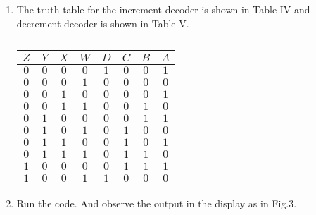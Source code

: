 \documentclass[conference]{IEEEtran}
\begin{document}
\begin {enumerate}
\begin{table} [htbp]
\centering
\begin{tabular}{| c | c | c | c | c | c | c |c |} \hline
$Z$ & $Y$ & $X$ & $W$ & $D$ & $C$ & $B$ & $A$ \\\hline
$0$ & $0$ & $0$ & $0$ & $0$ & $0$ & $0$ & $1$ \\ \hline 
$0$ & $0$ & $0$ & $1$ & $0$ & $0$ & $1$ & $0$ \\ \hline
$0$ & $0$ & $1$ & $0$ & $0$ & $0$ & $1$ & $1$ \\ \hline
$0$ & $0$ & $1$ & $1$ & $0$ & $1$ & $0$ & $0$ \\ \hline
$0$ & $1$ & $0$ & $0$ & $0$ & $1$ & $0$ & $1$ \\ \hline
$0$ & $1$ & $0$ & $1$ & $0$ & $1$ & $1$ & $0$ \\ \hline
$0$ & $1$ & $1$ & $0$ & $0$ & $1$ & $1$ & $1$ \\ \hline
$0$ & $1$ & $1$ & $1$ & $1$ & $0$ & $0$ & $0$ \\ \hline
$1$ & $0$ & $0$ & $0$ & $1$ & $0$ & $0$ & $1$ \\ \hline
$1$ & $0$ & $0$ & $1$ & $0$ & $0$ & $0$ & $0$ \\ \hline
\end{tabular}
\vspace{0.1cm}
\caption{\label{tab:widgets}}
\end{table}

\item The truth table for the increment decoder is shown in Table IV and decrement decoder is shown in Table V.

\begin{table} [htbp]
\centering
\begin{tabular}{| c | c | c | c | c | c | c |c |} \hline
$Z$ & $Y$ & $X$ & $W$ & $D$ & $C$ & $B$ & $A$ \\\hline
$0$ & $0$ & $0$ & $0$ & $1$ & $0$ & $0$ & $1$ \\ \hline 
$0$ & $0$ & $0$ & $1$ & $0$ & $0$ & $0$ & $0$ \\ \hline
$0$ & $0$ & $1$ & $0$ & $0$ & $0$ & $0$ & $1$ \\ \hline
$0$ & $0$ & $1$ & $1$ & $0$ & $0$ & $1$ & $0$ \\ \hline
$0$ & $1$ & $0$ & $0$ & $0$ & $0$ & $1$ & $1$ \\ \hline
$0$ & $1$ & $0$ & $1$ & $0$ & $1$ & $0$ & $0$ \\ \hline
$0$ & $1$ & $1$ & $0$ & $0$ & $1$ & $0$ & $1$ \\ \hline
$0$ & $1$ & $1$ & $1$ & $0$ & $1$ & $1$ & $0$ \\ \hline
$1$ & $0$ & $0$ & $0$ & $0$ & $1$ & $1$ & $1$ \\ \hline
$1$ & $0$ & $0$ & $1$ & $1$ & $0$ & $0$ & $0$ \\ \hline
\end{tabular}
\vspace{0.1cm}
\caption{\label{tab:widgets}}
\end{table}

\item Run the code. And observe the output in the display as in Fig.3.

\end {enumerate}                     
\end{document}
